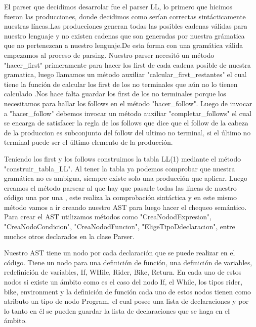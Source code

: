 \documentclass[12pt, letterpaper,spanish]{article}
\theoremstyle{definition}
\theoremstyle{remark}
\begin{document}
        El parser que decidimos desarrolar fue el parser LL, lo primero que hicimos fueron las producciones, donde decidimos como serían correctas sintácticamente nuestras líneas.Las producciones generan todas las posibles cadenas válidas para nuestro lenguaje y no existen cadenas que son generadas por nuestra grámatica que no pertenezcan a nuestro lenguaje.De esta forma con una gramática válida empezamos al proceso de parsing. Nuestro parser necesitó un método "hacer\_first" primeramente para hacer los first de cada cadena posible de nuestra gramatica, luego llamamos un método auxiliar "calcular\_first\_restantes" el cual tiene la función de calcular los first de los no terminales que aún no lo tienen calculado .Nos hace falta guardar los first de los no terminales porque los necesitamos para hallar los follows en el método "hacer\_follow". Luego de invocar a "hacer\_follow" debemos invocar un método auxiliar "completar\_follows" el cual se encarga de satisfacer la regla de los follows que dice que el follow de la cabeza de la produccion es subconjunto del follow del ultimo no terminal, si el último no terminal puede ser el último elemento de la producción.

        Teniendo los first y los follows construimos la tabla LL(1) mediante el método "construir\_tabla\_LL". Al tener la tabla ya podemos comprobar que nuestra gramática no es ambigua, siempre existe solo una producción que aplicar. Luego creamos el método parsear al que hay que pasarle todas las líneas de nuestro código una por una , este realiza la comprobación sintáctica y en este mismo método vamos a ir creando nuestro AST para luego hacer el chequeo semántico. Para crear el AST utilizamos métodos como "CreaNododExpresion",  "CreaNodoCondicion", "CreaNododFuncion", "EligeTipoDdeclaracion", entre muchos otros declarados en la clase Parser. 

        Nuestro AST tiene un nodo por cada declaración que se puede realizar en el código. Tiene un nodo para una definición de función, una 
        definición de variables, redefinición de variables, If, WHile, Rider, Bike, Return. En cada uno de estos nodos si existe un ámbito como es el caso del nodo If, el While, los tipos rider, bike, environment y la definición de función cada uno de estos nodos tienen como atributo un tipo de nodo Program, el cual posee una lista de declaraciones y por lo tanto en él se pueden guardar la lista de declaraciones que se haga en el ámbito.
\end{document}
